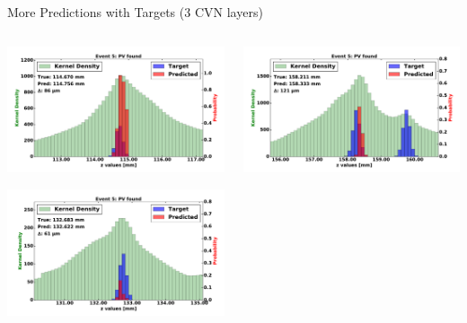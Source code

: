 \begin{frame}{More Predictions with Targets (3 CVN layers)}
  \begin{columns}[c]
        \begin{center}
            \includegraphics[width=1\textwidth,height=0.45\textwidth, trim=18 0 18 0]{images/120000_3layer_32.pdf}
    
            \includegraphics[width=1\textwidth, height=0.45\textwidth,trim=18 0 18 0]{images/120000_3layer_33.pdf}

        \end{center}
        \begin{center}
           \includegraphics[width=1\textwidth, height=0.45\textwidth, trim=18 0 18 0]{images/120000_3layer_34.pdf}
    

\end{center}
\end{columns}
\end{frame}
